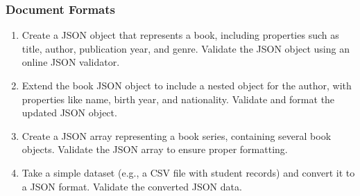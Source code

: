 \begin{exerciseboxcomputer}
\subsubsection*{Document Formats}
\begin{enumerate}
    \item Create a JSON object that represents a book, including properties such as title, author, publication year, and genre. Validate the JSON object using an online JSON validator.
    \item Extend the book JSON object to include a nested object for the author, with properties like name, birth year, and nationality. Validate and format the updated JSON object.
    \item Create a JSON array representing a book series, containing several book objects. Validate the JSON array to ensure proper formatting.
    \item Take a simple dataset (e.g., a CSV file with student records) and convert it to a JSON format. Validate the converted JSON data.
\end{enumerate}
\end{exerciseboxcomputer}

